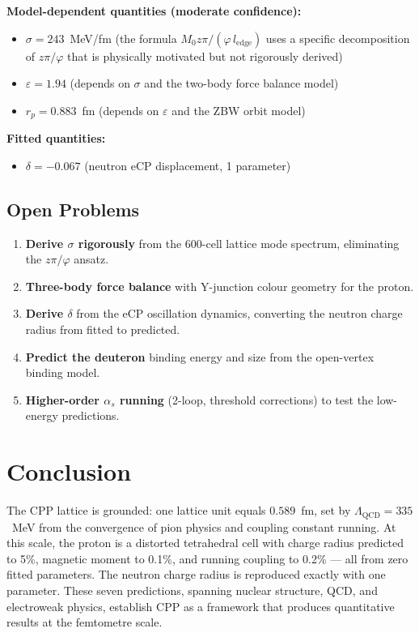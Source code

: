 \documentclass[12pt,a4paper]{article}
\begin{document}
\textbf{Model-dependent quantities (moderate confidence):}
\begin{itemize}
\item $\sigma = 243$~MeV/fm (the formula $M_0 z\pi/(\varphi\, l_{\mathrm{edge}})$ uses a specific decomposition of $z\pi/\varphi$ that is physically motivated but not rigorously derived)
\item $\varepsilon = 1.94$ (depends on $\sigma$ and the two-body force balance model)
\item $r_p = 0.883$~fm (depends on $\varepsilon$ and the ZBW orbit model)
\end{itemize}

\textbf{Fitted quantities:}
\begin{itemize}
\item $\delta = -0.067$ (neutron eCP displacement, 1 parameter)
\end{itemize}

\subsection{Open Problems}

\begin{enumerate}
\item \textbf{Derive $\sigma$ rigorously} from the 600-cell lattice mode spectrum, eliminating the $z\pi/\varphi$ ansatz.
\item \textbf{Three-body force balance} with Y-junction colour geometry for the proton.
\item \textbf{Derive $\delta$} from the eCP oscillation dynamics, converting the neutron charge radius from fitted to predicted.
\item \textbf{Predict the deuteron} binding energy and size from the open-vertex binding model.
\item \textbf{Higher-order $\alpha_s$ running} (2-loop, threshold corrections) to test the low-energy predictions.
\end{enumerate}

\section{Conclusion}

The CPP lattice is grounded: one lattice unit equals $0.589$~fm, set by $\Lambda_{\mathrm{QCD}} = 335$~MeV from the convergence of pion physics and coupling constant running. At this scale, the proton is a distorted tetrahedral cell with charge radius predicted to 5\%, magnetic moment to 0.1\%, and running coupling to 0.2\% --- all from zero fitted parameters. The neutron charge radius is reproduced exactly with one parameter. These seven predictions, spanning nuclear structure, QCD, and electroweak physics, establish CPP as a framework that produces quantitative results at the femtometre scale.
\end{document}
